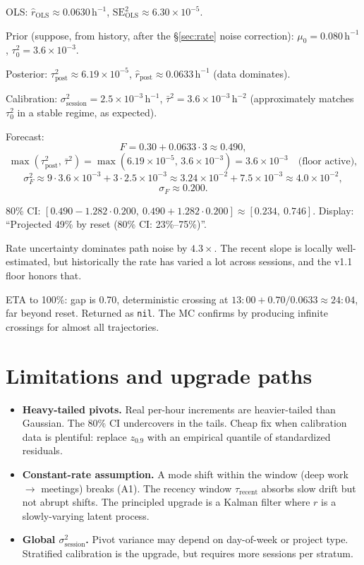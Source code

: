 \documentclass[11pt]{article}
\newcommand{\rpost}{\hat r_{\text{post}}}
\newcommand{\taupostsq}{\tau_{\text{post}}^2}
\newcommand{\tauzerosq}{\tau_0^2}
\newcommand{\rols}{\hat r_{\text{OLS}}}
\newcommand{\seolssq}{\mathrm{SE}_{\text{OLS}}^2}
\newcommand{\sigsessionsq}{\sigma_{\text{session}}^2}
\newcommand{\taurecent}{\tau_{\text{recent}}}
\begin{document}
OLS: $\rols \approx 0.0630\,\mathrm{h}^{-1}$, $\seolssq \approx 6.30 \times
10^{-5}$.

Prior (suppose, from history, after the \S\ref{sec:rate} noise correction):
$\mu_0 = 0.080\,\mathrm{h}^{-1}$, $\tauzerosq = 3.6 \times 10^{-3}$.

Posterior: $\taupostsq \approx 6.19 \times 10^{-5}$, $\rpost \approx
0.0633\,\mathrm{h}^{-1}$ (data dominates).

Calibration: $\sigsessionsq = 2.5 \times 10^{-3}\,\mathrm{h}^{-1}$, $\bar\tau^2
= 3.6 \times 10^{-3}\,\mathrm{h}^{-2}$ (approximately matches $\tauzerosq$ in a
stable regime, as expected).

Forecast:
\[
  F = 0.30 + 0.0633 \cdot 3 \approx 0.490,
\]
\[
  \max(\taupostsq,\, \bar\tau^2) = \max(6.19 \times 10^{-5},\, 3.6 \times 10^{-3})
    = 3.6 \times 10^{-3} \quad \text{(floor active)},
\]
\[
  \sigma_F^2 \approx 9 \cdot 3.6 \times 10^{-3}
    + 3 \cdot 2.5 \times 10^{-3}
    \approx 3.24 \times 10^{-2} + 7.5 \times 10^{-3}
    \approx 4.0 \times 10^{-2},
\]
\[
  \sigma_F \approx 0.200.
\]

80\% CI: $[0.490 - 1.282 \cdot 0.200,\ 0.490 + 1.282 \cdot 0.200]
\approx [0.234,\ 0.746]$. Display: ``Projected 49\% by reset (80\% CI:
23\%--75\%)''.

Rate uncertainty dominates path noise by $4.3\times$. The recent slope is
locally well-estimated, but historically the rate has varied a lot across
sessions, and the v1.1 floor honors that.

ETA to 100\%: gap is 0.70, deterministic crossing at $13{:}00 +
0.70/0.0633 \approx 24{:}04$, far beyond reset. Returned as \texttt{nil}.
The MC confirms by producing infinite crossings for almost all
trajectories.

\section{Limitations and upgrade paths}

\begin{itemize}
  \item \textbf{Heavy-tailed pivots.} Real per-hour increments are
    heavier-tailed than Gaussian. The 80\% CI undercovers in the tails.
    Cheap fix when calibration data is plentiful: replace $z_{0.9}$ with an
    empirical quantile of standardized residuals.
  \item \textbf{Constant-rate assumption.} A mode shift within the window
    (deep work $\to$ meetings) breaks (A1). The recency window $\taurecent$
    absorbs slow drift but not abrupt shifts. The principled upgrade is a
    Kalman filter where $r$ is a slowly-varying latent process.
  \item \textbf{Global $\sigsessionsq$.} Pivot variance may depend on
    day-of-week or project type. Stratified calibration is the upgrade, but
    requires more sessions per stratum.
\end{itemize}
\end{document}
